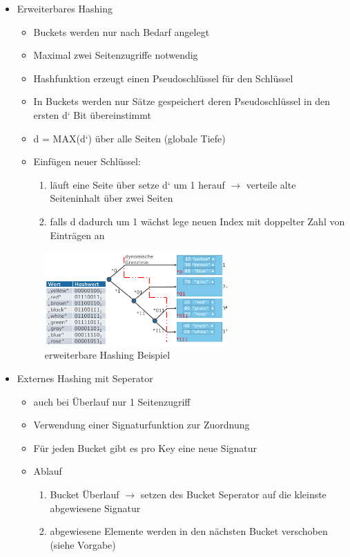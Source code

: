 \documentclass[a4paper]{article}
\begin{document}
\begin{enumerate}
\begin{itemize}
            \item Erweiterbares Hashing
            \begin{itemize}
                \item Buckets werden nur nach Bedarf angelegt
                \item Maximal zwei Seitenzugriffe notwendig
                \item Hashfunktion erzeugt einen Pseudoschlüssel für den Schlüssel
                \item In Buckets werden nur Sätze gespeichert deren Pseudoschlüssel in den ersten d‘ Bit übereinstimmt
                \item d = MAX(d‘) über alle Seiten (globale Tiefe)
                \item Einfügen neuer Schlüssel:
                \begin{enumerate}
                    \item läuft eine Seite über setze d‘ um 1 herauf $\to$ verteile alte Seiteninhalt über zwei Seiten
                    \item falls d dadurch um 1 wächst lege neuen Index mit doppelter Zahl von Einträgen an
                \end{enumerate}
            \end{itemize}
            
            \begin{figure} [htp]
                \centering
                \includegraphics[width=7cm]{images/erweiterbaresHashing.png}
                \caption{erweiterbare Hashing Beispiel}
                \label{fig:erweiterbaresHashing}
            \end{figure}
            
            \item Externes Hashing mit Seperator
            \begin{itemize}
                \item auch bei Überlauf nur 1 Seitenzugriff
                \item Verwendung einer Signaturfunktion zur Zuordnung
                \item Für jeden Bucket gibt es pro Key eine neue Signatur
                \item Ablauf
                \begin{enumerate}
                    \item Bucket Überlauf $\to$ setzen des Bucket Seperator auf die kleinste abgewiesene Signatur 
                    \item abgewiesene Elemente werden in den nächsten Bucket verschoben (siehe Vorgabe)
                \end{enumerate}
                

\end{itemize}
\end{itemize}
\end{enumerate}
\end{document}
